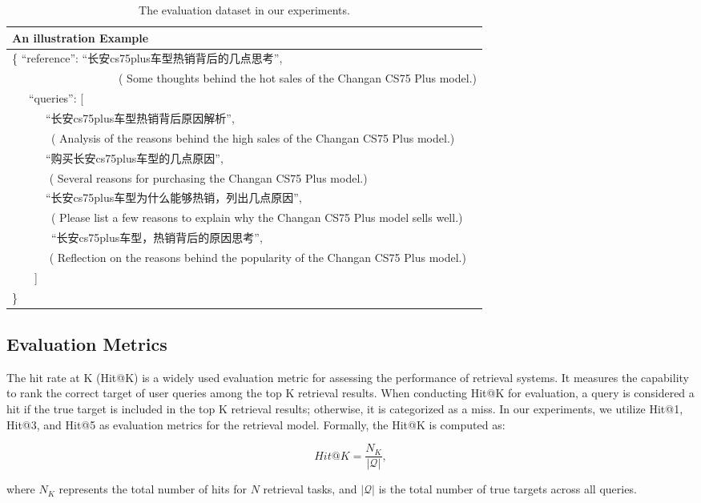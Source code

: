 \documentclass[mathematics,article,submit,moreauthors]{Definitions/mdpi}
\newcommand{\1}[1]{\mathds{1}\left[#1\right]}
\begin{document}
\begin{table}[H] 
	\caption{The evaluation dataset in our experiments.} \label{tab:eval_dataset}
	\begin{tabularx}{\textwidth}{L}
	\toprule
		\textbf{An illustration Example}	\\
		\midrule
		\{ ``reference'': ``长安cs75plus车型热销背后的几点思考'',~~~~~~~~~~~~~~~~~~~~~~~~~~~~~~~ \\
		~~~~~~~~~~~~~~~~~~~({\color{blue} Some thoughts behind the hot sales of the Changan CS75 Plus model.}) \\ 
		~~~``queries'': [\\
		~~~~~~``长安cs75plus车型热销背后原因解析'', \\
		~~~~~~~({\color{blue} Analysis of the reasons behind the high sales of the Changan CS75 Plus model.}) \\ 
		~~~~~~``购买长安cs75plus车型的几点原因'', \\
		~~~~~~ ({\color{blue} Several reasons for purchasing the Changan CS75 Plus model.}) \\ 
		~~~~~~``长安cs75plus车型为什么能够热销，列出几点原因'', \\
		~~~~~~~({\color{blue} Please list a few reasons to explain why the Changan CS75 Plus model sells well.}) \\ 
		~~~~~~~``长安cs75plus车型，热销背后的原因思考'',~~~~ \\
		~~~~~~ ({\color{blue} Reflection on the reasons behind the popularity of the Changan CS75 Plus model.}) \\ 
		~~~~] ~~~~~~~~~~~~~~~~~~~~~~~~~~~\\
		\}~~~~~~~~~~~~~~~~~~~~~~~~~~~~~~~~~~~~~~~~~~~~~~~~~~~~~~~~~~~~~~~~~~~~~~~~~\\
		\bottomrule
	\end{tabularx}
\end{table}


\subsection{Evaluation Metrics}
\label{sec:metrics}
The hit rate at K (Hit@K) is a widely used evaluation metric for assessing the performance of retrieval systems. It measures the capability to rank the correct target of user queries among the top K retrieval results. When conducting Hit@K for evaluation, a query is considered a hit if the true target is included in the top K retrieval results; otherwise, it is categorized as a miss. In our experiments, we utilize Hit@1, Hit@3, and Hit@5 as evaluation metrics for the retrieval model. Formally, the Hit@K is computed as:
\begin{linenomath}
	\begin{equation}\label{eq:hit}
		Hit@K = \frac{N_K}{|\mathcal{Q}|}, 
	\end{equation}
\end{linenomath}
where $N_K$ represents the total number of hits for $N$ retrieval tasks, and $|\mathcal{Q}|$ is the total number of true targets across all queries.
\end{document}
